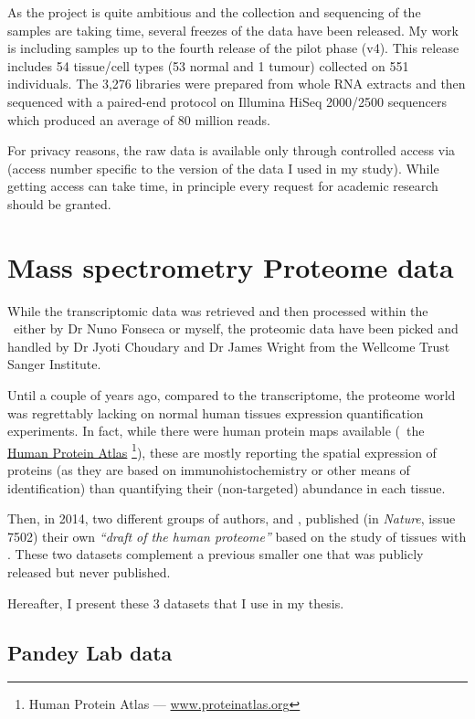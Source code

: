 As the project is quite ambitious and the collection and sequencing of the samples
are taking time, several freezes of the data have been released. My work is
including samples up to the fourth release of the pilot phase (v4). This
release includes 54 tissue/cell types (53 normal and 1 tumour)
collected on 551 individuals.
The 3,276 libraries were prepared from whole \gls{RNA} extracts and then sequenced
with a paired-end protocol on Illumina HiSeq 2000/2500 sequencers which produced
an average of 80 million reads.

For privacy reasons, the raw data is available only through controlled access via
 (access number specific to the version of the data I used
in my study). While getting access can take time, in principle every request for
academic research should be granted.

\section{Mass spectrometry Proteome data}

While the transcriptomic data was retrieved and then processed within the \EBI\
either by Dr Nuno Fonseca or myself, the proteomic data have been picked and
handled by Dr Jyoti Choudary and Dr James Wright from the Wellcome Trust
Sanger Institute.

Until a couple of years ago, compared to the transcriptome, the proteome world
was regrettably lacking on normal human tissues expression quantification
experiments. In fact, while there were human protein maps available
(\eg\ the \href{www.proteinatlas}{Human Protein Atlas}%
\footnote{Human Protein Atlas --- \href{http://www.proteinatlas.org}%
{www.proteinatlas.org}}), these
are mostly reporting the spatial expression of proteins (as they are based
on immunohistochemistry or other means of identification) than quantifying
their (non-targeted) abundance in each tissue.

Then, in 2014, two different groups of authors, \cite{PandeyData}
and \cite{KusterData}, published (in \textit{Nature},
issue 7502) their own \emph{``draft of the human proteome''}
based on the study of tissues with \ms. These two datasets complement a previous
smaller one that was publicly released but never published.

Hereafter, I present these 3 datasets that I use in my thesis.

\subsection{Pandey Lab data}

